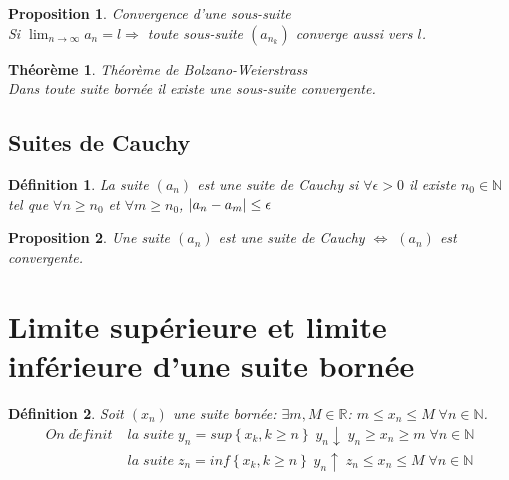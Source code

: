 \documentclass[10pt,a4paper]{book}
\newcommand{\R}{\mathbb{R}}
\newcommand{\N}{\mathbb{N}}
\DeclarePairedDelimiter\abs{\lvert}{\rvert}
\newtheorem{theorem}{Théorème}[section]
\newtheorem{definition}{Définition}[section]
\newtheorem{proposition}{Proposition}[section]
\begin{document}
\begin{proposition} Convergence d'une sous-suite \\
Si $\lim_{n\rightarrow \infty}a_n = l \Rightarrow$ toute sous-suite $(a_{n_k})$ converge aussi vers $l$.
\end{proposition}
\begin{theorem} Théorème de Bolzano-Weierstrass \\
Dans toute suite bornée il existe une sous-suite convergente.
\end{theorem}

\subsection{Suites de Cauchy}

\begin{definition}
La suite $(a_n)$ est une suite de Cauchy si $\forall \epsilon > 0$ il existe $n_0\in \N$ tel que $\forall n\geq n_0$ et $\forall m\geq n_0$, $\abs{a_n - a_m} \leq \epsilon$
\end{definition}
\begin{proposition}
Une suite $(a_n)$ est une suite de Cauchy $\Leftrightarrow$ $(a_n)$ est convergente.
\end{proposition}

\section{Limite supérieure et limite inférieure d'une suite bornée}

\begin{definition}
Soit $(x_n)$ une suite bornée: $\exists m,M\in \R$: $m\leq x_n\leq M \; \forall n\in \N$. 
\begin{align*}
On\; d\acute{e}finit\; & la\; suite\; y_n = sup\left\lbrace x_k, k\geq n\right\rbrace \; y_n\downarrow \; y_n \geq x_n \geq m \; \forall n \in \N \\
& la\; suite\; z_n = inf\left\lbrace x_k, k\geq n\right\rbrace \; y_n\uparrow \; z_n \leq x_n \leq M \; \forall n \in \N
\end{align*}
\end{definition}



\end{document}

